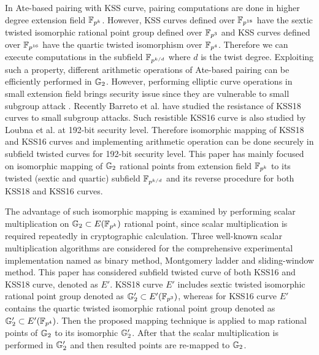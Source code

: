 In Ate-based pairing with KSS curve,  pairing computations are done in higher degree extension field $\mathbb{F}_{p^k}$.
However, KSS curves defined over $\mathbb{F}_{p^{18}}$ have the sextic twisted isomorphic rational point group defined over $\mathbb{F}_{p^3}$ and KSS curves defined over $\mathbb{F}_{p^{16}}$ have the quartic twisted  isomorphism over $\mathbb{F}_{p^4}$. 
Therefore we can execute computations in the subfield $\mathbb{F}_{p^{k/d}}$ where $d$ is the twist degree. 
Exploiting such a property, different arithmetic operations of Ate-based pairing can be efficiently performed in ${\mathbb{G}}_{2}$.  
However, performing elliptic curve operations in small extension field brings security issue since they are vulnerable to small subgroup attack \cite{sub_group_attack}. 
Recently Barreto et al. \cite{sub_sec} have studied the resistance of  KSS18 curves to small subgroup attacks. 
Such resistible KSS16 curve is also studied by Loubna et al. \cite{kss_lub} at 192-bit security level. 
Therefore isomorphic mapping of KSS18 and KSS16 curves and implementing arithmetic operation can be done securely in subfield twisted curves for 192-bit security level.
This paper has mainly focused on isomorphic mapping of ${\mathbb{G}}_{2}$ rational points from extension field $\mathbb{F}_{p^k}$ to its twisted (sextic and quartic) subfield $\mathbb{F}_{p^{k/d}}$ and its reverse procedure for both KSS18 and KSS16 curves. 

The advantage of such isomorphic mapping is examined by performing scalar multiplication on ${\mathbb{G}}_{2} \subset E(\mathbb{F}_{p^k})$ rational point, since scalar multiplication is required repeatedly in cryptographic calculation. 
Three well-known scalar multiplication algorithms are considered for the comprehensive experimental implementation named as binary method, Montgomery ladder and sliding-window method.
This paper has considered subfield  twisted curve of both  KSS16 and KSS18 curve, denoted as $E'$. 
KSS18 curve $E'$ includes sextic twisted isomorphic rational point group denoted as ${\mathbb{G}}_{2}' \subset E'(\mathbb{F}_{p^3})$, whereas  for KSS16 curve $E'$ contains the quartic twisted  isomorphic rational point group denoted as ${\mathbb{G}}_{2}' \subset E'(\mathbb{F}_{p^4})$.
Then the proposed mapping technique is applied to map rational points of ${\mathbb{G}}_{2}$ to its isomorphic ${\mathbb{G}}_{2}'$. 
After that the scalar multiplication  is performed  in ${\mathbb{G}}_{2}'$ and then resulted points are re-mapped to ${\mathbb{G}}_{2}$.

